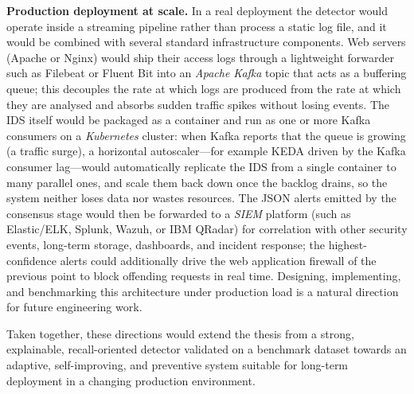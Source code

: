\documentclass[../main.tex]{subfiles}
\begin{document}
\begin{romanlist}
  \item \textbf{Production deployment at scale.} In a real deployment the
        detector would operate inside a streaming pipeline rather than
        process a static log file, and it would be combined with several
        standard infrastructure components. Web servers (Apache or Nginx)
        would ship their access logs through a lightweight forwarder such as
        Filebeat or Fluent Bit into an \emph{Apache Kafka} topic that acts as
        a buffering queue; this decouples the rate at which logs are produced
        from the rate at which they are analysed and absorbs sudden traffic
        spikes without losing events. The IDS itself would be packaged as a
        container and run as one or more Kafka consumers on a
        \emph{Kubernetes} cluster: when Kafka reports that the queue is
        growing (a traffic surge), a horizontal autoscaler---for example KEDA
        driven by the Kafka consumer lag---would automatically replicate the
        IDS from a single container to many parallel ones, and scale them
        back down once the backlog drains, so the system neither loses data
        nor wastes resources. The JSON alerts emitted by the consensus stage
        would then be forwarded to a \emph{SIEM} platform (such as Elastic/ELK,
        Splunk, Wazuh, or IBM QRadar) for correlation with other security
        events, long-term storage, dashboards, and incident response; the
        highest-confidence alerts could additionally drive the web application
        firewall of the previous point to block offending requests in real
        time. Designing, implementing, and benchmarking this architecture
        under production load is a natural direction for future engineering
        work.
\end{romanlist}

Taken together, these directions would extend the thesis from a strong,
explainable, recall-oriented detector validated on a benchmark dataset
towards an adaptive, self-improving, and preventive system suitable for
long-term deployment in a changing production environment. 
\end{document}
